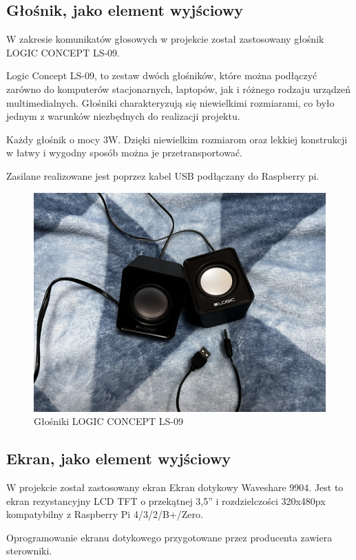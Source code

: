 \documentclass[a4paper,12pt,reqno]{article}
\begin{document}
\subsection{Głośnik, jako element wyjściowy}

W zakresie komunikatów głosowych w projekcie został zastosowany głośnik LOGIC CONCEPT LS-09.

Logic Concept LS-09, to zestaw dwóch głośników, które można podłączyć zarówno do komputerów stacjonarnych, laptopów, jak i różnego rodzaju urządzeń multimedialnych. Głośniki charakteryzują się niewielkimi rozmiarami, co było jednym z warunków niezbędnych do realizacji projektu.

Każdy głośnik o mocy 3W. Dzięki niewielkim rozmiarom oraz lekkiej konstrukcji w łatwy i wygodny sposób można je przetransportować.

Zasilane realizowane jest poprzez kabel USB podłączany do Raspberry pi.

\begin{figure}[H]%
\centering
\includegraphics[width=0.8\columnwidth]{imgs/glosnik.jpg}
\caption{Głośniki LOGIC CONCEPT LS-09  \label{glosnik}}
\quad
\end{figure}

\subsection{Ekran, jako element wyjściowy}

W projekcie został zastosowany ekran Ekran dotykowy Waveshare 9904. Jest to ekran rezystancyjny LCD TFT o przekątnej 3,5'' i rozdzielczości 320x480px kompatybilny z Raspberry Pi 4/3/2/B+/Zero.

Oprogramowanie ekranu dotykowego przygotowane przez producenta zawiera sterowniki.
\end{document}
